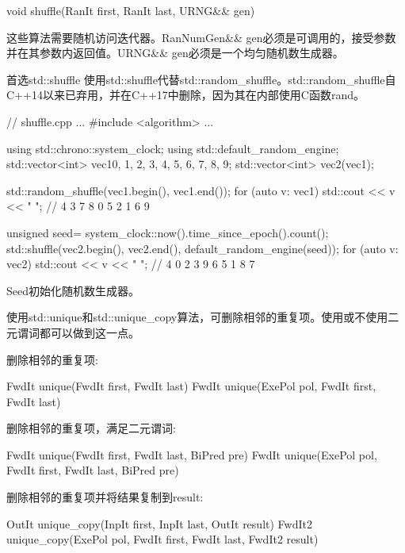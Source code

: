 \begin{cpp}
void shuffle(RanIt first, RanIt last, URNG&& gen)
\end{cpp}

这些算法需要随机访问迭代器。RanNumGen\&\& gen必须是可调用的，接受参数并在其参数内返回值。URNG\&\& gen必须是一个均匀随机数生成器。

\begin{myTip}{首选std::shuffle}
使用std::shuffle代替std::random\_shuffle。std::random\_shuffle自C++14以来已弃用，并在C++17中删除，因为其在内部使用C函数rand。
\end{myTip}


\begin{cpp}
// shuffle.cpp
...
#include <algorithm>
...

using std::chrono::system_clock;
using std::default_random_engine;
std::vector<int> vec1{0, 1, 2, 3, 4, 5, 6, 7, 8, 9};
std::vector<int> vec2(vec1);

std::random_shuffle(vec1.begin(), vec1.end());
for (auto v: vec1) std::cout << v << " "; // 4 3 7 8 0 5 2 1 6 9

unsigned seed= system_clock::now().time_since_epoch().count();
std::shuffle(vec2.begin(), vec2.end(), default_random_engine(seed));
for (auto v: vec2) std::cout << v << " "; // 4 0 2 3 9 6 5 1 8 7
\end{cpp}

Seed初始化随机数生成器。


使用std::unique和std::unique\_copy算法，可删除相邻的重复项。使用或不使用二元谓词都可以做到这一点。

删除相邻的重复项:

\begin{cpp}
FwdIt unique(FwdIt first, FwdIt last)
FwdIt unique(ExePol pol, FwdIt first, FwdIt last)
\end{cpp}

删除相邻的重复项，满足二元谓词:

\begin{cpp}
FwdIt unique(FwdIt first, FwdIt last, BiPred pre)
FwdIt unique(ExePol pol, FwdIt first, FwdIt last, BiPred pre)
\end{cpp}

删除相邻的重复项并将结果复制到result:

\begin{cpp}
OutIt unique_copy(InpIt first, InpIt last, OutIt result)
FwdIt2 unique_copy(ExePol pol, FwdIt first, FwdIt last, FwdIt2 result)
\end{cpp}

